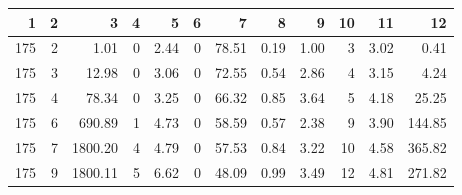 \begin{tabular}{rrrrrrrrrrrr}
\toprule
1 & 2 & 3 & 4 & 5 & 6 & 7 & 8 & 9 & 10 & 11 & 12 \\
\midrule
175 & 2 & 1.01 & 0 & 2.44 & 0 & 78.51 & 0.19 & 1.00 & 3 & 3.02 & 0.41 \\
175 & 3 & 12.98 & 0 & 3.06 & 0 & 72.55 & 0.54 & 2.86 & 4 & 3.15 & 4.24 \\
175 & 4 & 78.34 & 0 & 3.25 & 0 & 66.32 & 0.85 & 3.64 & 5 & 4.18 & 25.25 \\
175 & 6 & 690.89 & 1 & 4.73 & 0 & 58.59 & 0.57 & 2.38 & 9 & 3.90 & 144.85 \\
175 & 7 & 1800.20 & 4 & 4.79 & 0 & 57.53 & 0.84 & 3.22 & 10 & 4.58 & 365.82 \\
175 & 9 & 1800.11 & 5 & 6.62 & 0 & 48.09 & 0.99 & 3.49 & 12 & 4.81 & 271.82 \\
\bottomrule
\end{tabular}
